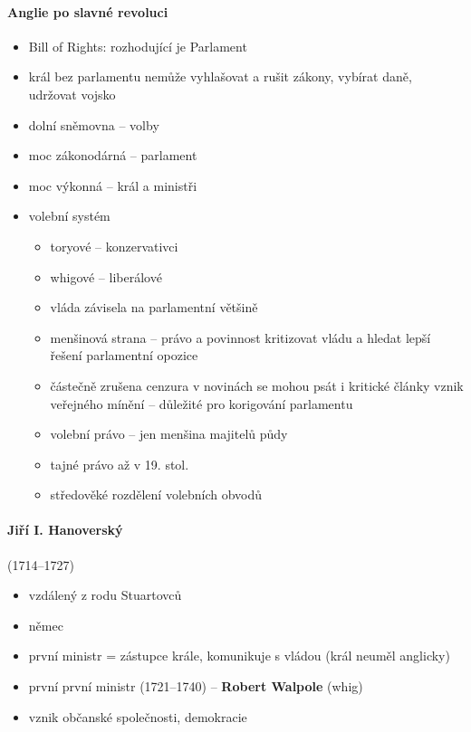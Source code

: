 \paragraph{Anglie po slavné revoluci}
\begin{itemize}
\item Bill of Rights: rozhodující je Parlament
\item král bez parlamentu nemůže vyhlašovat a rušit zákony, vybírat daně, udržovat vojsko
\item dolní sněmovna -- volby
\item moc zákonodárná -- parlament
\item moc výkonná -- král a ministři
\item volební systém
	\begin{itemize}
	\item toryové -- konzervativci
	\item whigové -- liberálové
	\item vláda závisela na parlamentní většině
	\item menšinová strana -- právo a povinnost kritizovat vládu a hledat lepší řešení \ra parlamentní opozice
	\item částečně zrušena cenzura \ra v novinách se mohou psát i kritické články \ra vznik veřejného mínění  -- důležité pro korigování parlamentu
	\item volební právo -- jen menšina majitelů půdy
	\item tajné právo až v 19. stol.
	\item středověké rozdělení volebních obvodů
	\end{itemize}
\end{itemize}


\paragraph{Jiří I. Hanoverský}(1714--1727)
\begin{itemize}
\item vzdálený z rodu Stuartovců
\item němec 
\item první ministr = zástupce krále, komunikuje s vládou (král neuměl anglicky)
\item první první ministr (1721--1740) -- \textbf{Robert Walpole} (whig) 
\item vznik občanské společnosti, demokracie
\end{itemize}



